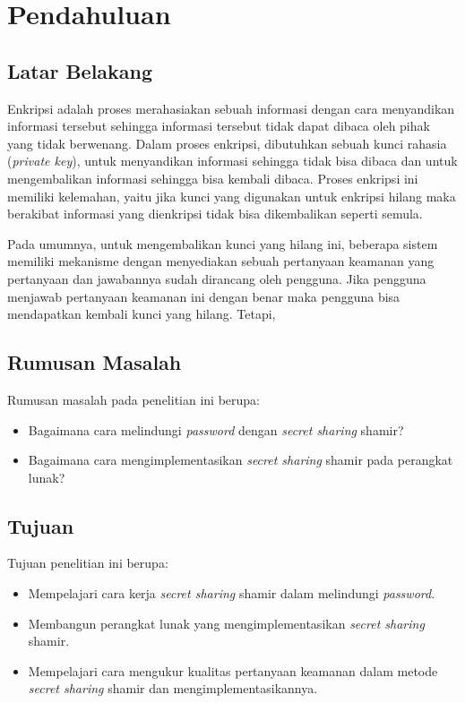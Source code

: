 \chapter{Pendahuluan}
\label{chap:Pendahuluan}

\section{\textbf{Latar Belakang}}
\label{sec:latar belakang}

Enkripsi adalah proses merahasiakan sebuah informasi dengan cara menyandikan informasi tersebut sehingga informasi tersebut tidak dapat dibaca oleh pihak yang tidak berwenang. Dalam proses enkripsi, dibutuhkan sebuah kunci rahasia (\textit{private key}), untuk menyandikan informasi sehingga tidak bisa dibaca dan untuk mengembalikan informasi sehingga bisa kembali dibaca. Proses enkripsi ini memiliki kelemahan, yaitu jika kunci yang digunakan untuk enkripsi hilang maka  berakibat informasi yang dienkripsi tidak bisa dikembalikan seperti semula.

Pada umumnya, untuk mengembalikan kunci yang hilang ini, beberapa sistem memiliki mekanisme dengan menyediakan sebuah pertanyaan keamanan yang pertanyaan dan jawabannya sudah dirancang oleh pengguna. Jika pengguna menjawab pertanyaan keamanan ini dengan benar maka pengguna bisa mendapatkan kembali kunci yang hilang. Tetapi, 

\section{\textbf{Rumusan Masalah}}
\label{sec:rumusan masalah}

Rumusan masalah pada penelitian ini berupa:
\begin{itemize}
	\item Bagaimana cara melindungi \textit{password} dengan \textit{secret sharing} shamir?
	\item Bagaimana cara mengimplementasikan {\it secret sharing} shamir pada perangkat lunak?
\end{itemize}

\section{\textbf{Tujuan}}
\label{sec:tujuan}

Tujuan penelitian ini berupa:
\begin{itemize}
	\item Mempelajari cara kerja {\it secret sharing} shamir dalam melindungi {\it password}.
	\item Membangun perangkat lunak yang mengimplementasikan {\it secret sharing} shamir.
	\item Mempelajari cara mengukur kualitas pertanyaan keamanan dalam metode {\it secret sharing} shamir dan mengimplementasikannya.
\end{itemize}

